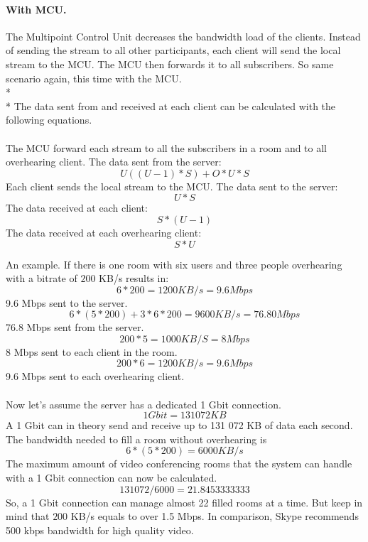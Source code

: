 \documentclass[12pt, titlepage]{article}
\begin{document}
\paragraph{With MCU.}
The Multipoint Control Unit decreases the bandwidth load of the clients. Instead of sending the stream to all other participants, each client will send the local stream to the MCU. The MCU then forwards it to all subscribers.
So same scenario again, this time with the MCU.
\\*
\\*
The data sent from and received at each client can be calculated with the following equations.\\\\
The MCU forward each stream to all the subscribers in a room and to all overhearing client. The data sent from the server:
\begin{equation}
U((U-1)*S) + O*U*S
\end{equation} 
Each client sends the local stream to the MCU. The data sent to the server:
\begin{equation}
U*S
\end{equation} 
The data received at each client:
\begin{equation}
S*(U-1)
\end{equation} 
The data received at each overhearing client:
\begin{equation}
S*U
\end{equation} 

An example. If there is one room with six users and three people overhearing with a bitrate of $200$ KB/s results in:
\begin{equation}
6*200 = 1200 KB/s = 9.6 Mbps
\end{equation}
9.6 Mbps sent to the server.
\begin{equation}
6*(5*200) + 3*6*200 = 9 600 KB/s = 76.80 Mbps
\end{equation}
76.8 Mbps sent from the server.
\begin{equation}
200*5 = 1000 KB/S  = 8 Mbps
\end{equation}
8 Mbps sent to each client in the room.
\begin{equation}
200*6 = 1200 KB/s = 9.6 Mbps
\end{equation}
9.6 Mbps sent to each overhearing client.
\\\\
Now let's assume the server has a dedicated 1 Gbit connection. 
\begin{equation}
1 Gbit = 131 072 KB
\end{equation}
A 1 Gbit can in theory send and receive up to 131 072 KB of data each second. The bandwidth needed to fill a room without overhearing is 
\begin{equation}
6*(5*200) = 6 000 KB/s
\end{equation}
The maximum amount of video conferencing rooms that the system can handle with a 1 Gbit connection can now be calculated.
\begin{equation}
131 072/6 000 = 21.8453333333
\end{equation}
So, a 1 Gbit connection can manage almost 22 filled rooms at a time. But keep in mind that $200$ KB/s equals to over 1.5 Mbps. In comparison, Skype recommends 500 kbps bandwidth for high quality video\cite{39}.
\end{document}
